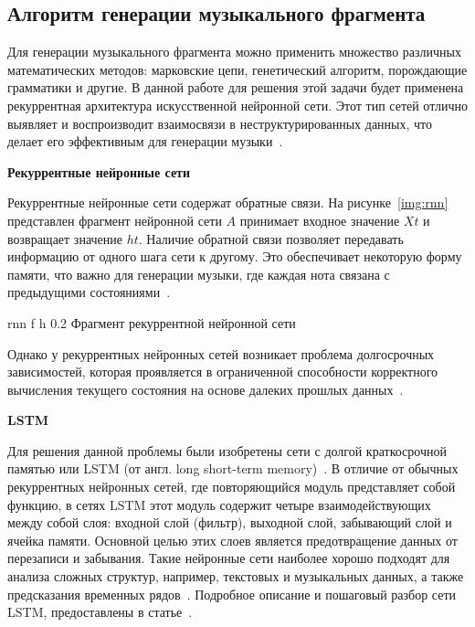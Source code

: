 \subsection{Алгоритм генерации музыкального фрагмента}

Для генерации музыкального фрагмента можно применить множество различных
математических методов: марковские цепи, генетический алгоритм, порождающие
грамматики и другие. В данной работе для решения этой задачи будет применена рекуррентная архитектура искусственной нейронной сети.
Этот тип сетей отлично выявляет и воспроизводит взаимосвязи в неструктурированных данных, что делает его эффективным для генерации музыки~\cite{nikitin2022, tolstov, toktarbekov2022}.

\textbf{Рекуррентные нейронные сети}

Рекуррентные нейронные сети содержат обратные связи. На рисунке~\ref{img:rnn} представлен фрагмент нейронной сети $A$ принимает входное значение $Xt$ и возвращает значение $ht$. 
Наличие обратной связи позволяет передавать информацию от одного шага сети к другому.
Это обеспечивает некоторую форму памяти, что важно для генерации музыки, где каждая нота связана с предыдущими состояниями~\cite{nikitin2022, lindigrin2019}. 
 
	{rnn} %
	{f} %
	{h} %
	{0.2\textwidth} %
	{Фрагмент рекуррентной нейронной сети} %


Однако у рекуррентных нейронных сетей возникает проблема долгосрочных зависимостей, которая проявляется в ограниченной способности корректного вычисления текущего состояния на основе далеких прошлых данных~\cite{nikitin2022, tolstov, lindigrin2019}.

\textbf{LSTM}

Для решения данной проблемы были изобретены сети с долгой краткосрочной
памятью или LSTM (от англ. long short-term memory)~\cite{lindigrin2019}. В отличие от обычных рекуррентных нейронных сетей, где повторяющийся модуль представляет собой функцию, в сетях LSTM этот модуль содержит четыре взаимодействующих между собой слоя: входной слой (фильтр), выходной слой, забывающий слой и ячейка памяти. Основной целью этих слоев является предотвращение данных от перезаписи и забывания. Такие нейронные сети наиболее хорошо подходят для анализа сложных структур, например, текстовых и музыкальных данных, а также предсказания временных рядов~\cite{nikitin2022}.
Подробное описание и пошаговый разбор сети LSTM, предоставлены в статье~\cite{actuality}.

